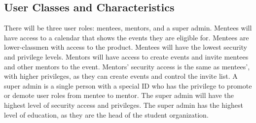 \subsection{User Classes and Characteristics}

There will be three user roles: mentees, mentors, and a super admin. Mentees
will have access to a calendar that shows the events they are eligible for.
Mentees are lower-classmen with access to the product. Mentees will have the
lowest security and privilege levels. Mentors will have access to create events
and invite mentees and other mentors to the event. Mentors' security access is
the same as mentees', with higher privileges, as they can create events and
control the invite list. A super admin is a single person with a special ID who
has the privilege to promote or demote user roles from mentee to mentor. The
super admin will have the highest level of security access and privileges. The
super admin has the highest level of education, as they are the head of the
student organization.
